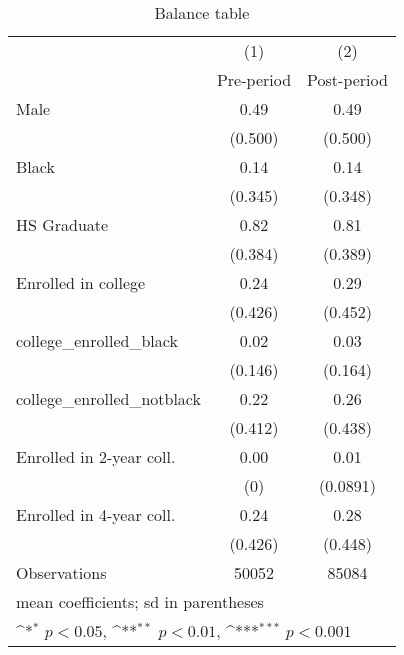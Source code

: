 \begin{table}[htbp]\centering
\def\sym#1{\ifmmode^{#1}\else\(^{#1}\)\fi}
\caption{Balance table}
\begin{tabular}{l*{2}{c}}
\hline\hline
                    &\multicolumn{1}{c}{(1)}&\multicolumn{1}{c}{(2)}\\
                    &\multicolumn{1}{c}{Pre-period}&\multicolumn{1}{c}{Post-period}\\
\hline
Male                &        0.49         &        0.49         \\
                    &     (0.500)         &     (0.500)         \\
[1em]
Black               &        0.14         &        0.14         \\
                    &     (0.345)         &     (0.348)         \\
[1em]
HS Graduate         &        0.82         &        0.81         \\
                    &     (0.384)         &     (0.389)         \\
[1em]
Enrolled in college &        0.24         &        0.29         \\
                    &     (0.426)         &     (0.452)         \\
[1em]
college\_enrolled\_black&        0.02         &        0.03         \\
                    &     (0.146)         &     (0.164)         \\
[1em]
college\_enrolled\_notblack&        0.22         &        0.26         \\
                    &     (0.412)         &     (0.438)         \\
[1em]
Enrolled in 2-year coll.&        0.00         &        0.01         \\
                    &         (0)         &    (0.0891)         \\
[1em]
Enrolled in 4-year coll.&        0.24         &        0.28         \\
                    &     (0.426)         &     (0.448)         \\
\hline
Observations        &       50052         &       85084         \\
\hline\hline
\multicolumn{3}{l}{\footnotesize mean coefficients; sd in parentheses}\\
\multicolumn{3}{l}{\footnotesize \sym{*} \(p<0.05\), \sym{**} \(p<0.01\), \sym{***} \(p<0.001\)}\\
\end{tabular}
\end{table}
